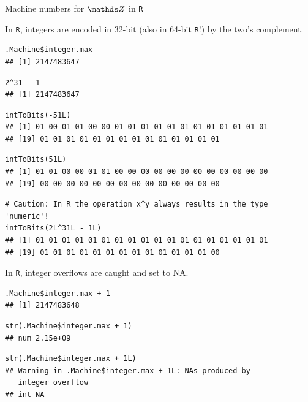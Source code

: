 \documentclass[11pt,compress,t,notes=noshow, xcolor=table]{beamer}
\begin{document}
\begin{vbframe}{Machine numbers for $\Z$ in \texttt{R}}

In \texttt{R}, integers are encoded in 32-bit (also in 64-bit \texttt{R}!) by the two's complement. 

\footnotesize
\vspace{0.5cm}
\begin{verbatim}
.Machine$integer.max
## [1] 2147483647
\end{verbatim}

\vspace{0.2cm}
\begin{verbatim}
2^31 - 1
## [1] 2147483647
\end{verbatim}


\framebreak 

\footnotesize
\vspace{0.5cm}
\begin{verbatim}
intToBits(-51L)
## [1] 01 00 01 01 00 00 01 01 01 01 01 01 01 01 01 01 01 01
## [19] 01 01 01 01 01 01 01 01 01 01 01 01 01 01
\end{verbatim}

\vspace{0.2cm}
\begin{verbatim}
intToBits(51L)
## [1] 01 01 00 00 01 01 00 00 00 00 00 00 00 00 00 00 00 00
## [19] 00 00 00 00 00 00 00 00 00 00 00 00 00 00
\end{verbatim}

\vspace{0.2cm}
\begin{verbatim}
# Caution: In R the operation x^y always results in the type 'numeric'!
intToBits(2L^31L - 1L)
## [1] 01 01 01 01 01 01 01 01 01 01 01 01 01 01 01 01 01 01
## [19] 01 01 01 01 01 01 01 01 01 01 01 01 01 00
\end{verbatim}



\framebreak 
\normalsize
In \texttt{R}, integer overflows are caught and set to NA.
\lz
\footnotesize
\begin{verbatim}
.Machine$integer.max + 1 
## [1] 2147483648
\end{verbatim}

\vspace{0.2cm}
\begin{verbatim}
str(.Machine$integer.max + 1) 
## num 2.15e+09
\end{verbatim}

\vspace{0.2cm}
\begin{verbatim}
str(.Machine$integer.max + 1L)
## Warning in .Machine$integer.max + 1L: NAs produced by 
   integer overflow
## int NA
\end{verbatim}


\end{vbframe}
\normalsize
\end{document}

